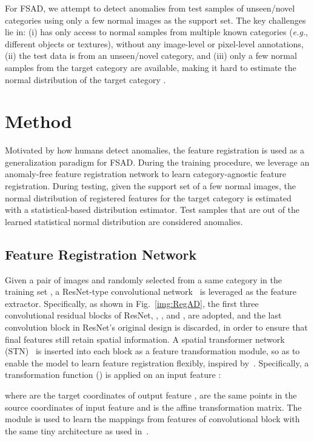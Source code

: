 \documentclass[runningheads]{llncs}
\begin{document}
For FSAD, we attempt to detect anomalies from test samples of unseen/novel categories using only a few normal images as the support set. The key challenges lie in: (i)  has only access to normal samples from multiple known categories (\emph{e.g.}, different objects or textures), without any image-level or pixel-level annotations, (ii) the test data is from an unseen/novel category, and (iii) only a few normal samples from the target category  are available, making it hard to estimate the normal distribution of the target category .

\section{Method}\label{sec:method}
Motivated by how humans detect anomalies, the feature registration is used as a generalization paradigm for FSAD. During the training procedure, we leverage an anomaly-free feature registration network to learn category-agnostic feature registration. During testing, given the support set of a few normal images, the normal distribution of registered features for the target category is estimated with a statistical-based distribution estimator. Test samples that are out of the learned statistical normal distribution are considered anomalies.

\subsection{Feature Registration Network}
Given a pair of images  and  randomly selected from a same category in the training set , a ResNet-type convolutional network~\cite{he2016deep} is leveraged as the feature extractor. Specifically, as shown in Fig.~\ref{img:RegAD},  the first three convolutional residual blocks of ResNet, , , and , are adopted, and the last convolution block in ResNet's original design is discarded, in order to ensure that final features still retain spatial information. A spatial transformer network (STN)~\cite{STN} is inserted into each block as a feature transformation module, so as to enable the model to learn feature registration flexibly, inspired by~\cite{focus}. Specifically, a transformation function  () is applied on an input feature :

where  are the target coordinates of output feature ,  are the same points in the source coordinates of input feature  and  is the affine transformation matrix. The module  is used to learn the mappings from features of convolutional block  with the same tiny architecture as used in~\cite{STN}. 
\end{document}
